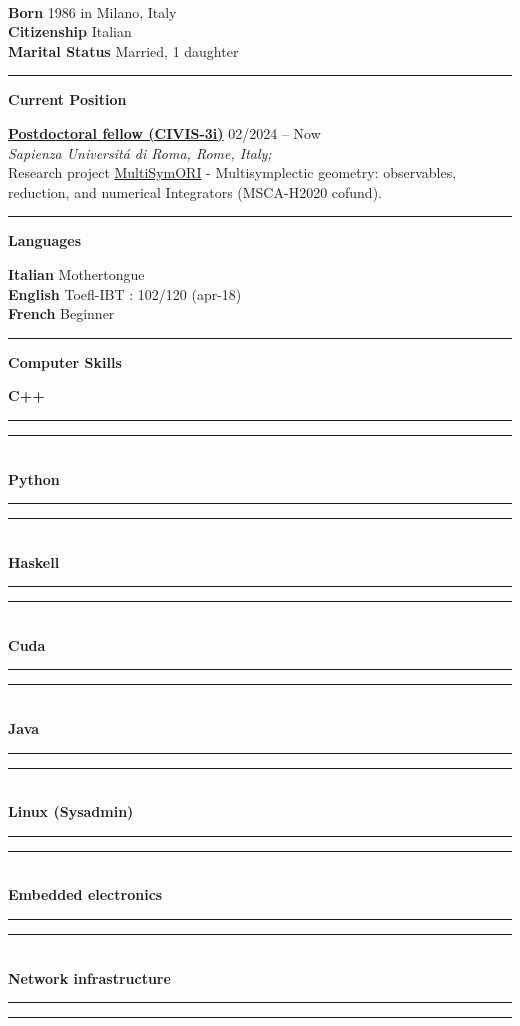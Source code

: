 \documentclass[a4paper]{article}
\newcommand{\crule}[3][black]{\textcolor{#1}{\rule{#2}{#3}}}
\newcommand{\progbar}[4][black]{\crule[#1]{#3}{#4}\crule[#1!10!white!90]{#2}{#4}}
\newcommand{\block}[1]{\hrule \vspace{0.2cm} \textbf{\Large #1} \vspace{0.2cm}}
\newcommand{\voice}[5]{\href{#4}{\textbf{#1}} \hfill #2 \\ \textit{#3} \\ {\small #5} \vspace{0.2cm} \\}
\newcommand{\skill}[2]{\textbf{#1} \hfill #2 \\}
\newcommand{\skillbar}[4]{\textbf{#1} \hfill \progbar{#2}{#3}{#4} \\}
\begin{document}
	\vfill

	\tableofcontents
	
	\vfill

	\clearpage

	\begin{minipage}[c]{0.6\columnwidth}
		\\
	\end{minipage} 
	\hfill
	\begin{minipage}[t]{0.37\columnwidth}
		\skill{Born}{1986 in Milano, Italy }
		\skill{Citizenship}{Italian }
		\skill{Marital Status}{Married, 1 daughter}
	\end{minipage}
	\vspace{-0.25em}

	\begin{minipage}[t]{0.6\columnwidth}

		\block{Current Position}

		\voice{Postdoctoral fellow (CIVIS-3i)}
			{02/2024 -- Now}
			{Sapienza Universit\'a di Roma, Rome, Italy;}
			{https://civis3i.univ-amu.fr/en/civis3i-alliance-programme}       
			{Research project \href{https://civis3i.univ-amu.fr/en/antonio-michele-miti}{MultiSymORI} - Multisymplectic geometry: observables, reduction, and numerical Integrators (MSCA-H2020 cofund).\vspace{-0.25cm}}


	\end{minipage} 
	\hfill
	\begin{minipage}[t]{0.375\columnwidth}


		\block{Languages} 
		
		\skill{Italian}{Mothertongue}
		\skill{English}{Toefl-IBT : 102/120 (apr-18)}
		\skill{French}{Beginner}


		\block{Computer Skills} 
		
		\skillbar{C++}
			{1.4cm}
			{0.6cm}
			{0.25cm}
		\skillbar{Python}
			{1.1cm}
			{0.9cm}
			{0.25cm}
		\skillbar{Haskell}
			{1.5cm}
			{0.5cm}
			{0.25cm}
		\skillbar{Cuda}
			{1.1cm}
			{0.9cm}
			{0.25cm}
		\skillbar{Java}
			{1.2cm}
			{0.8cm}
			{0.25cm}
		\skillbar{Linux (Sysadmin)}
			{0.7cm}
			{1.3cm}
			{0.25cm}
		\skillbar{Embedded electronics}
			{1.5cm}
			{0.5cm}
			{0.25cm}
		\skillbar{Network infrastructure}
			{1.6cm}
			{0.4cm}
			{0.25cm}
	\end{minipage}
\end{document}
